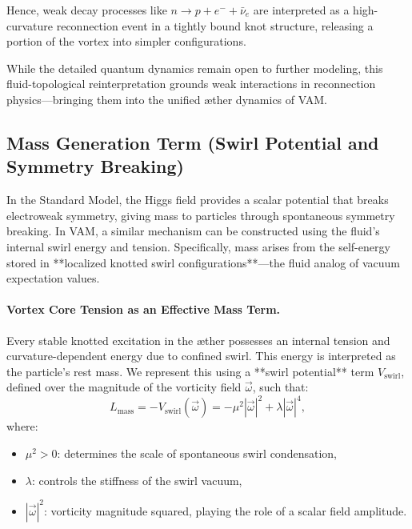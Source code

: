 Hence, weak decay processes like \( n \to p + e^- + \bar{\nu}_e \) are interpreted as a high-curvature reconnection event in a tightly bound knot structure, releasing a portion of the vortex into simpler configurations.

\medskip
While the detailed quantum dynamics remain open to further modeling, this fluid-topological reinterpretation grounds weak interactions in reconnection physics—bringing them into the unified æther dynamics of VAM.

\subsection{Mass Generation Term (Swirl Potential and Symmetry Breaking)}

In the Standard Model, the Higgs field provides a scalar potential that breaks electroweak symmetry, giving mass to particles through spontaneous symmetry breaking. In VAM, a similar mechanism can be constructed using the fluid’s internal swirl energy and tension. Specifically, mass arises from the self-energy stored in **localized knotted swirl configurations**—the fluid analog of vacuum expectation values.

\vspace{0.5em}
\paragraph{Vortex Core Tension as an Effective Mass Term.}
Every stable knotted excitation in the æther possesses an internal tension and curvature-dependent energy due to confined swirl. This energy is interpreted as the particle’s rest mass. We represent this using a **swirl potential** term \( V_{\text{swirl}} \), defined over the magnitude of the vorticity field \( \vec{\omega} \), such that:
\begin{equation}
    L_{\text{mass}} = -V_{\text{swirl}}(\vec{\omega}) = -\mu^2 |\vec{\omega}|^2 + \lambda |\vec{\omega}|^4,
    \label{eq:mass-term}
\end{equation}
where:
\begin{itemize}
    \item \( \mu^2 > 0 \): determines the scale of spontaneous swirl condensation,
    \item \( \lambda \): controls the stiffness of the swirl vacuum,
    \item \( |\vec{\omega}|^2 \): vorticity magnitude squared, playing the role of a scalar field amplitude.
\end{itemize}

